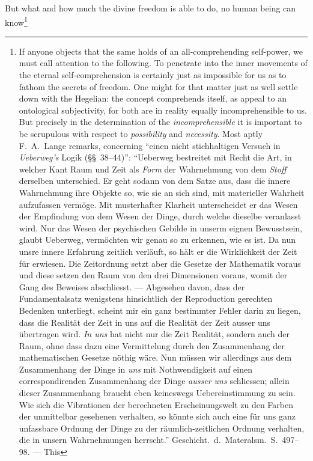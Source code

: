 \documentclass[12pt]{article}
\begin{document}
But what and how much the divine freedom is able to do, no human being can
know\footnote{If anyone objects that the same holds of an all-comprehending
self-power, we must call attention to the following. To penetrate into the
inner movements of the eternal self-comprehension is certainly just as
impossible for us as to fathom the secrets of freedom. One might for that
matter just as well settle down with the Hegelian: the concept comprehends
itself, as appeal to an ontological subjectivity, for both are in reality
equally incomprehensible to us. But precisely in the determination of the
\emph{incomprehensible} it is important to be scrupulous with respect to
\emph{possibility} and \emph{necessity}. Most aptly F.\ A.\ Lange remarks,
concerning
``einen nicht stichhaltigen Versuch in \emph{Ueberweg's} Logik
(§§~38--44)'': ``Ueberweg bestreitet mit Recht die Art, in welcher Kant Raum
und Zeit als \emph{Form} der Wahrnehmung von dem \emph{Stoff} derselben
unterschied. Er geht sodann von dem Satze aus, dass die innere Wahrnehmung
ihre Objekte so, wie sie an sich sind, mit materieller Wahrheit aufzufassen
vermöge. Mit musterhafter Klarheit unterscheidet er das Wesen der Empfindung
von dem Wesen der Dinge, durch welche dieselbe veranlasst wird. Nur das Wesen
der psychischen Gebilde in unserm eignen Bewusstsein, glaubt Ueberweg,
vermöchten wir genau so zu erkennen, wie es ist. Da nun unsre innere Erfahrung
zeitlich verläuft, so hält er die Wirklichkeit der Zeit für erwiesen. Die
Zeitordnung setzt aber die Gesetze der Mathematik voraus und diese setzen den
Raum von den drei Dimensionen voraus, womit der Gang des Beweises abschliesst.
--- Abgesehen davon, dass der Fundamentalsatz wenigstens hinsichtlich der
Reproduction gerechten Bedenken unterliegt, scheint mir ein ganz bestimmter
Fehler darin zu liegen, dass die Realität der Zeit in uns auf die Realität der
Zeit ausser uns übertragen wird. \emph{In uns} hat nicht nur die Zeit
Realität, sondern auch der Raum, ohne dass dazu eine Vermittelung durch den
Zusammenhang der mathematischen Gesetze nöthig wäre. Nun müssen wir allerdings
aus dem Zusammenhang der Dinge in \emph{uns} mit Nothwendigkeit auf einen
correspondirenden Zusammenhang der Dinge \emph{ausser uns} schliessen; allein
dieser Zusammenhang braucht eben keineswegs Uebereinstimmung zu sein. Wie sich
die Vibrationen der berechneten Erscheinungswelt zu den Farben der unmittelbar
gesehenen verhalten, so könnte sich auch eine für uns ganz unfassbare Ordnung
der Dinge zu der räumlich-zeitlichen Ordnung verhalten, die in unsern
Wahrnehmungen herrscht.'' Geschicht.\ d.\ Materalsm.\ S.\ 497--98. --- This
}
\end{document}
